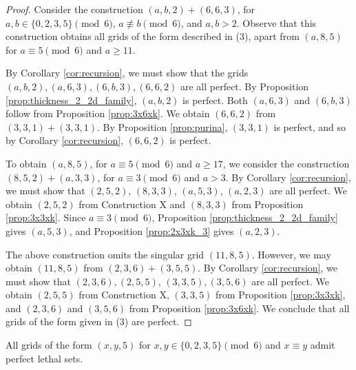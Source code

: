 \begin{proof}
Consider the construction $(a,b,2) + (6,6,3)$, for $a,b \in \{0,2,3,5\} \pmod 6$, $a \not\equiv b \pmod 6$, and $a,b > 2$. Observe that this construction obtains all grids of the form described in (3), apart from $(a,8,5)$ for $a \equiv 5 \pmod 6$ and $a \geq 11$.

By Corollary \ref{cor:recursion}, we must show that the grids $(a,b,2), (a,6,3), (6,b,3), (6,6,2)$ are all perfect. By Proposition \ref{prop:thickness_2_2d_family}, $(a,b,2)$ is perfect. Both $(a,6,3)$ and $(6,b,3)$ follow from Proposition \ref{prop:3x6xk}. We obtain $(6,6,2)$ from $(3,3,1)+(3,3,1)$. By Proposition \ref{prop:purina}, $(3,3,1)$ is perfect, and so by Corollary \ref{cor:recursion}, $(6,6,2)$ is perfect.

To obtain $(a,8,5)$, for $a \equiv 5 \pmod 6$ and $a \geq 17$, we consider the construction $(8,5,2) + (a,3,3)$, for $a \equiv 3 \pmod 6$ and $a>3$. By Corollary \ref{cor:recursion}, we must show that $(2,5,2)$, $(8,3,3)$, $(a,5,3)$, $(a,2,3)$ are all perfect. We obtain $(2,5,2)$ from Construction X and $(8,3,3)$ from Proposition \ref{prop:3x3xk}. Since $a \equiv 3 \pmod 6$, Proposition \ref{prop:thickness_2_2d_family} gives $(a,5,3)$, and Proposition \ref{prop:2x3xk_3} gives $(a,2,3)$. 

The above construction omits the singular grid $(11,8,5)$. However, we may obtain $(11,8,5)$ from $(2,3,6)+(3,5,5)$. By Corollary \ref{cor:recursion}, we must show that $(2,3,6), (2,5,5)$, $(3,3,5), (3,5,6)$ are all perfect. We obtain $(2,5,5)$ from Construction X, $(3,3,5)$ from Proposition \ref{prop:3x3xk}, and $(2,3,6)$ and $(3,5,6)$ from Proposition \ref{prop:3x6xk}. We conclude that all grids of the form given in (3) are perfect.
\end{proof}

\begin{lem}
\label{lem:thickness_5_case_4}
All grids of the form $(x,y,5)$ for $x,y \in \{0,2,3,5\} \pmod 6$ and $x \equiv y$ admit perfect lethal sets.
\end{lem}

